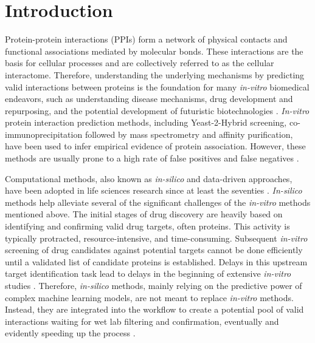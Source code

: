 \documentclass[utf8]{article}
\begin{document}
	\section{Introduction}
	Protein-protein interactions (PPIs) form a network of physical contacts and functional associations mediated by molecular bonds. These interactions are the basis for cellular processes and are collectively referred to as the cellular interactome. Therefore, understanding the underlying mechanisms by predicting valid interactions between proteins is the foundation for many \textit{in-vitro} biomedical endeavors, such as understanding disease mechanisms, drug development and repurposing, and the potential development of futuristic biotechnologies \cite{vidal_interactomenetworkshuman_2011} \cite{scott_smallmoleculesbig_2016}. \textit{In-vitro} protein interaction prediction methods, including Yeast-2-Hybrid screening, co-immunoprecipitation followed by mass spectrometry and affinity purification, have been used to infer empirical evidence of protein association. However, these methods are usually prone to a high rate of false positives and false negatives \cite{rao_proteinproteininteractiondetection_2014}.
	
	Computational methods, also known as \textit{in-silico} and data-driven approaches, have been adopted in life sciences research since at least the seventies \cite{wodak_computeranalysisproteinprotein_1978}. \textit{In-silico} methods help alleviate several of the significant challenges of the \textit{in-vitro} methods mentioned above. The initial stages of drug discovery are heavily based on identifying and confirming valid drug targets, often proteins. This activity is typically protracted, resource-intensive, and time-consuming. Subsequent \textit{in-vitro} screening of drug candidates against potential targets cannot be done efficiently until a validated list of candidate proteins is established. Delays in this upstream target identification task lead to delays in the beginning of extensive \textit{in-vitro} studies \cite{scannell_diagnosingdeclinepharmaceutical_2012}. Therefore, \textit{in-silico} methods, mainly relying on the predictive power of complex machine learning models, are not meant to replace \textit{in-vitro} methods. Instead, they are integrated into the workflow to create a potential pool of valid interactions waiting for wet lab filtering and confirmation, eventually and evidently speeding up the process \cite{vidal_interactomenetworkshuman_2011}.
	
\end{document}
